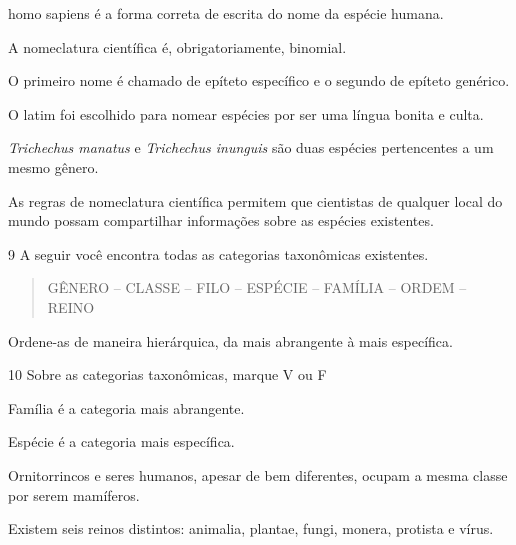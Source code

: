 \begin{boxlist}
\item homo sapiens é a forma correta de escrita do nome da espécie humana. 

\item A nomeclatura científica é, obrigatoriamente, binomial. 

\item O primeiro nome é chamado de epíteto específico e o segundo de
epíteto genérico. 

\item O latim foi escolhido para nomear espécies por ser uma língua bonita
e culta. 

\item \emph{Trichechus manatus} e \emph{Trichechus inunguis} são duas
espécies pertencentes a um mesmo gênero. 

\item As regras de nomeclatura científica permitem que cientistas de
qualquer local do mundo possam compartilhar informações sobre as
espécies existentes. 
\end{boxlist}

\num{9}  A seguir você encontra todas as categorias taxonômicas existentes.

\begin{quote}
GÊNERO -- CLASSE -- FILO -- ESPÉCIE -- FAMÍLIA -- ORDEM -- REINO
\end{quote}

Ordene-as de maneira hierárquica, da mais abrangente à mais específica.



\num{10}  Sobre as categorias taxonômicas, marque V ou F

\begin{boxlist}
\item Família é a categoria mais abrangente. 

\item Espécie é a categoria mais específica. 

\item Ornitorrincos e seres humanos, apesar de bem diferentes, ocupam a
mesma classe por serem mamíferos. 

\item Existem seis reinos distintos: animalia, plantae, fungi, monera,
protista e vírus. 
\end{boxlist}

